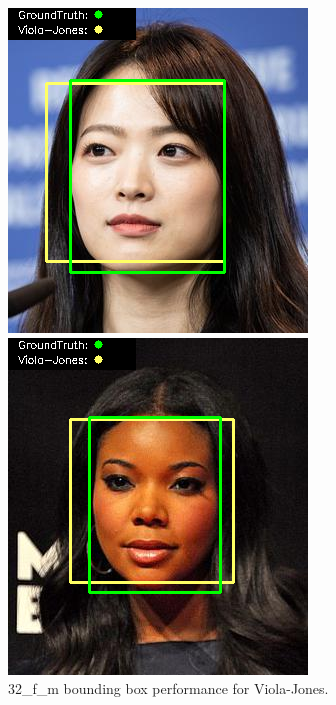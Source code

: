 \documentclass{l4proj}
\begin{document}
\begin{appendices}
\begin{figure}[h!]
  \centering
  \begin{minipage}{0.49\textwidth}
    \centering
     \includegraphics[width=\textwidth]{images/appendix/viola/32.png}
    \caption{32\_f\_m bounding box performance for Viola-Jones.}
    \label{whoopi_result}
  \end{minipage}
    \hfill
    \begin{minipage}{0.49\textwidth}
    \centering
     \includegraphics[width=\textwidth]{images/appendix/viola/33.png}

\end{minipage}
\end{figure}
\end{appendices}
\end{document}

